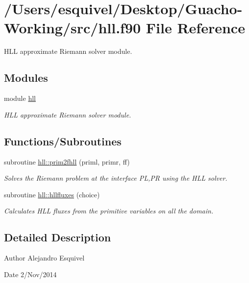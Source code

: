 \hypertarget{hll_8f90}{}\section{/\+Users/esquivel/\+Desktop/\+Guacho-\/\+Working/src/hll.f90 File Reference}
\label{hll_8f90}


H\+L\+L approximate Riemann solver module.  


\subsection*{Modules}
\begin{DoxyCompactItemize}
\item 
module \hyperlink{namespacehll}{hll}
\begin{DoxyCompactList}\small\item\em H\+L\+L approximate Riemann solver module. \end{DoxyCompactList}\end{DoxyCompactItemize}
\subsection*{Functions/\+Subroutines}
\begin{DoxyCompactItemize}
\item 
subroutine \hyperlink{namespacehll_aa67c7db7e17f7dedf7286320baeda1dd}{hll\+::prim2fhll} (priml, primr, ff)
\begin{DoxyCompactList}\small\item\em Solves the Riemann problem at the interface P\+L,P\+R using the H\+L\+L solver. \end{DoxyCompactList}\item 
subroutine \hyperlink{namespacehll_a27386fb5bcf705be5e8c2650484966c6}{hll\+::hllfluxes} (choice)
\begin{DoxyCompactList}\small\item\em Calculates H\+L\+L fluxes from the primitive variables on all the domain. \end{DoxyCompactList}\end{DoxyCompactItemize}


\subsection{Detailed Description}
\begin{DoxyAuthor}{Author}
Alejandro Esquivel 
\end{DoxyAuthor}
\begin{DoxyDate}{Date}
2/\+Nov/2014 
\end{DoxyDate}
